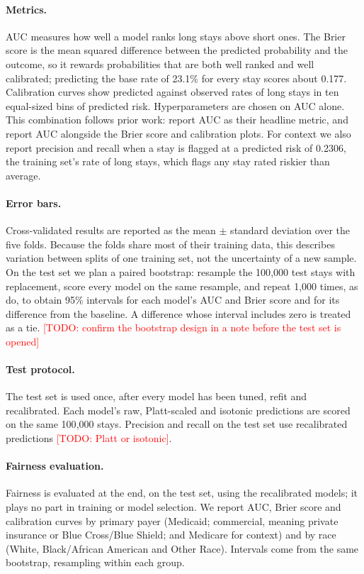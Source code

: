 \documentclass{article}
\newcommand{\todo}[1]{\textcolor{red}{[TODO: #1]}}
\begin{document}
\paragraph{Metrics.}
AUC measures how well a model ranks
long stays above short ones. The Brier score is the mean squared difference
between the predicted probability and the outcome, so it rewards
probabilities that are both well ranked and well calibrated; predicting the
base rate of 23.1\% for every stay scores about 0.177. Calibration curves show
predicted against observed rates of long stays in ten equal-sized bins of
predicted risk. Hyperparameters are chosen on AUC alone. This combination
follows prior work: \citet{rajkomar2018} report AUC as their headline metric,
and \citet{zeleke2023} report AUC alongside the Brier score and calibration
plots. For context we also report precision and recall when a stay is flagged
at a predicted risk of 0.2306, the training set's rate of long stays, which
flags any stay rated riskier than average.

\paragraph{Error bars.}
Cross-validated results are reported as the mean $\pm$ standard deviation
over the five folds. Because the folds share most of their training data,
this describes variation between splits of one training set, not the
uncertainty of a new sample. On the test set we plan a paired bootstrap:
resample the 100{,}000 test stays with replacement, score every model on the
same resample, and repeat 1{,}000 times, as \citet{rajkomar2018} do, to obtain
95\% intervals for each model's AUC and Brier score and for its difference from
the baseline. A difference whose interval includes zero is treated as a tie.
\todo{confirm the bootstrap design in a note before the test set is opened}

\paragraph{Test protocol.}
The test set is used once, after every model has been tuned, refit and
recalibrated. Each model's raw, Platt-scaled and isotonic predictions are
scored on the same 100{,}000 stays. Precision and recall on the test set use
recalibrated predictions \todo{Platt or isotonic}.

\paragraph{Fairness evaluation.}
Fairness is evaluated at the end, on the test set, using the recalibrated
models; it plays no part in training or model selection. We report AUC, Brier score and calibration curves by primary payer (Medicaid;
commercial, meaning private insurance or Blue Cross/Blue Shield; and Medicare
for context) and by race (White, Black/African American and Other Race).
Intervals come from the same bootstrap,
resampling within each group.
\end{document}
